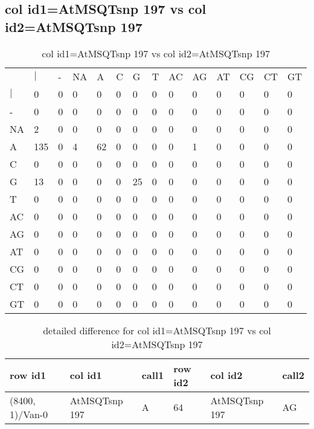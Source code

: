 \subsection{col id1=AtMSQTsnp 197 vs col id2=AtMSQTsnp 197}
\begin{center}
\begin{longtable}{|l|l|l|l|l|l|l|l|l|l|l|l|l|l|}
\caption{col id1=AtMSQTsnp 197 vs col id2=AtMSQTsnp 197} \label{table_dm566}\\
\hline
\\
\hline
&$|$&-&NA&A&C&G&T&AC&AG&AT&CG&CT&GT\\
$|$&0&0&0&0&0&0&0&0&0&0&0&0&0\\
-&0&0&0&0&0&0&0&0&0&0&0&0&0\\
NA&2&0&0&0&0&0&0&0&0&0&0&0&0\\
A&135&0&4&62&0&0&0&0&1&0&0&0&0\\
C&0&0&0&0&0&0&0&0&0&0&0&0&0\\
G&13&0&0&0&0&25&0&0&0&0&0&0&0\\
T&0&0&0&0&0&0&0&0&0&0&0&0&0\\
AC&0&0&0&0&0&0&0&0&0&0&0&0&0\\
AG&0&0&0&0&0&0&0&0&0&0&0&0&0\\
AT&0&0&0&0&0&0&0&0&0&0&0&0&0\\
CG&0&0&0&0&0&0&0&0&0&0&0&0&0\\
CT&0&0&0&0&0&0&0&0&0&0&0&0&0\\
GT&0&0&0&0&0&0&0&0&0&0&0&0&0\\
\hline
\end{longtable}
\end{center}

\begin{center}
\begin{longtable}{|l|l|l|l|l|l|}
\caption{detailed difference for col id1=AtMSQTsnp 197 vs col id2=AtMSQTsnp 197} \label{table_dm567}\\
\hline
row id1&col id1&call1&row id2&col id2&call2\\
\hline
(8400, 1)/Van-0&AtMSQTsnp 197&A&64&AtMSQTsnp 197&AG\\
\hline
\end{longtable}
\end{center}

